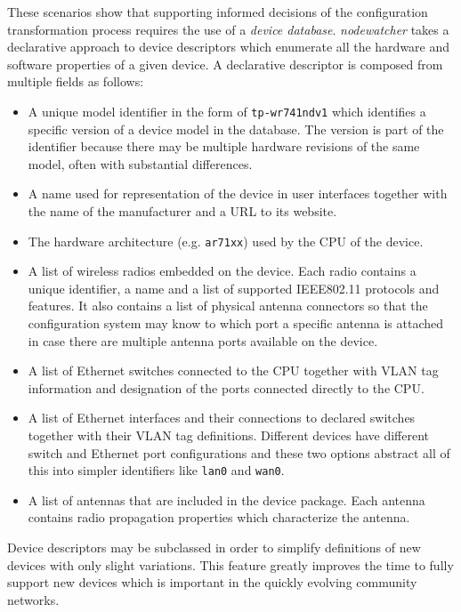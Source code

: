 \documentclass[5p,sort&compress]{elsarticle}
\newcommand{\nodewatcher}{\textit{nodewatcher}}
\begin{document}
These scenarios show that supporting informed decisions of the configuration transformation process requires the use of a {\em device database}.
\nodewatcher{} takes a declarative approach to device descriptors which enumerate all the hardware and software properties of a given device.
A declarative descriptor is composed from multiple fields as follows:
\begin{itemize}
\item A unique model identifier in the form of \texttt{tp-wr741ndv1} which identifies a specific version of a device model in the database. The version is part of the identifier because there may be multiple hardware revisions of the same model, often with substantial differences.

\item A name used for representation of the device in user interfaces together with the name of the manufacturer and a URL to its website.

\item The hardware architecture (e.g. \texttt{ar71xx}) used by the CPU of the device.

\item A list of wireless radios embedded on the device.
Each radio contains a unique identifier, a name and a list of supported IEEE802.11 protocols and features.
It also contains a list of physical antenna connectors so that the configuration system may know to which port a specific antenna is attached in case there are multiple antenna ports available on the device.

\item A list of Ethernet switches connected to the CPU together with VLAN tag information and designation of the ports connected directly to the CPU.

\item A list of Ethernet interfaces and their connections to declared switches together with their VLAN tag definitions. 
Different devices have different switch and Ethernet port configurations and these two options abstract all of this into simpler identifiers like \texttt{lan0} and \texttt{wan0}.

\item A list of antennas that are included in the device package.
Each antenna contains radio propagation properties which characterize the antenna.
\end{itemize}

Device descriptors may be subclassed in order to simplify definitions of new devices with only slight variations.
This feature greatly improves the time to fully support new devices which is important in the quickly evolving community networks.
\end{document}
